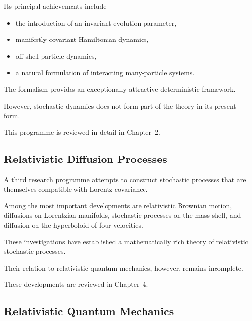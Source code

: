 Its principal achievements include

\begin{itemize}

\item the introduction of an invariant evolution parameter,

\item manifestly covariant Hamiltonian dynamics,

\item off-shell particle dynamics,

\item a natural formulation of interacting many-particle systems.

\end{itemize}

The formalism provides an exceptionally attractive deterministic
framework.

However, stochastic dynamics does not form part of the theory in its
present form.

This programme is reviewed in detail in Chapter~2.

\subsection{Relativistic Diffusion Processes}

A third research programme attempts to construct stochastic processes
that are themselves compatible with Lorentz covariance.

Among the most important developments are relativistic Brownian motion,
diffusions on Lorentzian manifolds, stochastic processes on the mass
shell, and diffusion on the hyperboloid of four-velocities.

These investigations have established a mathematically rich theory of
relativistic stochastic processes.

Their relation to relativistic quantum mechanics, however, remains
incomplete.

These developments are reviewed in Chapter~4.

\subsection{Relativistic Quantum Mechanics}


